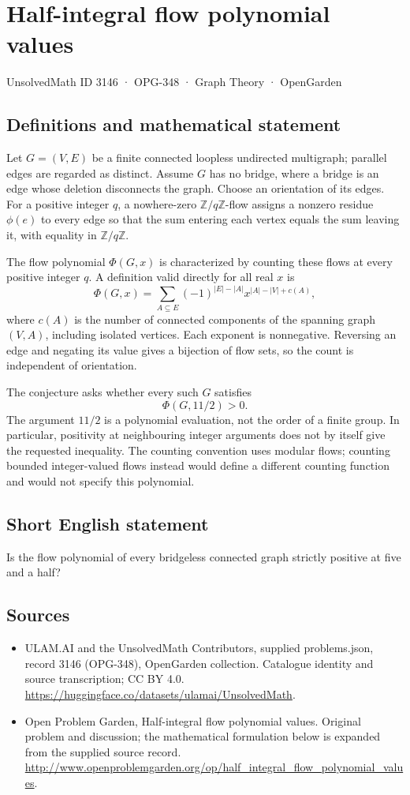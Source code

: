 \documentclass[11pt,a4paper]{article}
\begin{document}
\section*{Half-integral flow polynomial values}\label{3146}
{\small UnsolvedMath ID 3146 · OPG-348 · Graph Theory · OpenGarden}
\subsection{Definitions and mathematical statement}
Let $G=(V,E)$ be a finite connected loopless undirected multigraph;
parallel edges are regarded as distinct. Assume $G$ has no bridge,
where a bridge is an edge whose deletion disconnects the graph.
Choose an orientation of its edges. For a positive integer $q$, a
nowhere-zero $\mathbb Z/q\mathbb Z$-flow assigns a nonzero residue
$\phi(e)$ to every edge so that the sum entering each vertex equals
the sum leaving it, with equality in $\mathbb Z/q\mathbb Z$.

The flow polynomial $\Phi(G,x)$ is characterized by counting these
flows at every positive integer $q$. A definition valid directly
for all real $x$ is
\[
 \Phi(G,x)=\sum_{A\subseteq E}(-1)^{|E|-|A|}
 x^{|A|-|V|+c(A)},
\]
where $c(A)$ is the number of connected components of the spanning
graph $(V,A)$, including isolated vertices. Each exponent is
nonnegative. Reversing an edge and negating its value gives a
bijection of flow sets, so the count is independent of orientation.

The conjecture asks whether every such $G$ satisfies
\[
 \Phi(G,11/2)>0.
\]
The argument $11/2$ is a polynomial evaluation, not the order of
a finite group. In particular, positivity at neighbouring integer
arguments does not by itself give the requested inequality.
The counting convention uses modular flows; counting bounded
integer-valued flows instead would define a different counting
function and would not specify this polynomial.
\subsection{Short English statement}
Is the flow polynomial of every bridgeless connected graph strictly positive at five and a half?
\subsection{Sources}
\begin{itemize}
\item[S1] ULAM.AI and the UnsolvedMath Contributors, supplied problems.json, record 3146 (OPG-348), OpenGarden collection. Catalogue identity and source transcription; CC BY 4.0.
\url{https://huggingface.co/datasets/ulamai/UnsolvedMath}.
\item[S2] Open Problem Garden, Half-integral flow polynomial values. Original problem and discussion; the mathematical formulation below is expanded from the supplied source record.
\url{http://www.openproblemgarden.org/op/half_integral_flow_polynomial_values}.
\end{itemize}
\end{document}
